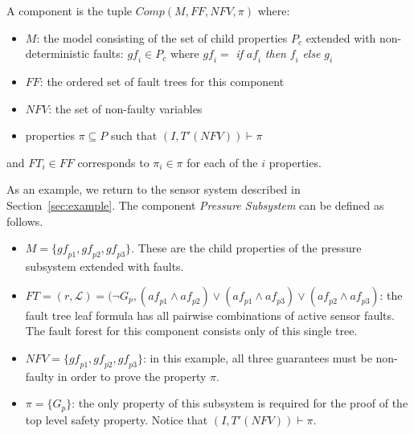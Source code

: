\begin{definition}
A component is the tuple $\mathit{Comp}(M, \mathit{FF}, \mathit{NFV}, \pi)$ where:
\begin{itemize}[label=\textbullet]
\item $M$: the model consisting of the set of child properties $P_c$ extended with non-deterministic faults: $\mathit{gf}_i \in P_c$ where $\mathit{gf}_i =$ \textit{if} $\mathit{af}_i$ \textit{then} $\mathit{f}_i$ \textit{else} $g_i$
\item $\mathit{FF}$: the ordered set of fault trees for this component
\item $\mathit{NFV}$: the set of non-faulty variables 
\item properties $\pi \subseteq P$ such that $(I, T'(\mathit{NFV})) \vdash \pi$
\end{itemize}
and $\mathit{FT}_i \in \mathit{FF}$ corresponds to $\pi_i \in \pi$ for each of the $i$ properties.  
\end{definition}


As an example, we return to the sensor system described in Section~\ref{sec:example}. The component {\em Pressure Subsystem} can be defined as follows. 

\begin{itemize}[label=\textbullet]
\item $M = \{\mathit{gf}_{p1}, \mathit{gf}_{p2}, \mathit{gf}_{p3}\}$. These are the child properties of the pressure subsystem extended with faults. 
\item $\mathit{FT} = (r, \mathcal{L}) = (\neg G_p, (\mathit{af}_{p1} \land \mathit{af}_{p2}) \lor (\mathit{af}_{p1} \land \mathit{af}_{p3}) \lor (\mathit{af}_{p2} \land \mathit{af}_{p3}) $: the fault tree leaf formula has all pairwise combinations of active sensor faults. The fault forest for this component consists only of this single tree.
\item $\mathit{NFV} = \{\mathit{gf}_{p1}, \mathit{gf}_{p2}, \mathit{gf}_{p3}\}$: in this example, all three guarantees must be non-faulty in order to prove the property $\pi$.
\item $\pi = \{G_p\}$: the only property of this subsystem is required for the proof of the top level safety property. Notice that $(I, T'(\mathit{NFV})) \vdash \pi$.
\end{itemize}


